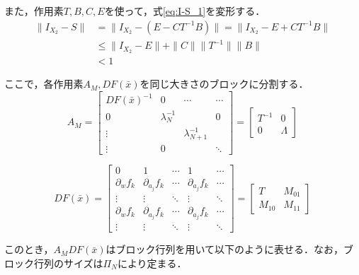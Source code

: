また，作用素$T,B,C,E$を使って，式\eqref{eq:I-S_1}を変形する．
\begin{equation}
  \label{eq:calc_norm}
  \begin{split}
    \|I_{X_2} - S \| &= \| I_{X_2} - (E-CT^{-1}B)  \| = \| I_{X_2} - E + CT^{-1}B \| \\
    & \leq \| I_{X_2} - E \| + \| C \| \| T^{-1} \| \| B \| \\
    & < 1
  \end{split}
\end{equation}

ここで，各作用素$A_M,DF(\bar{x})$を同じ大きさのブロックに分割する．
\begin{equation}
  A_M = \left[
    \begin{array}{c|ccc}
      DF(\bar{x})^{-1} & 0 & \cdots & \cdots \\ \hline
      0 & \lambda_N^{-1} &  & 0 \\
      \vdots &  & \lambda_{N+1}^{-1} &  \\
      \vdots & 0 &   & \ddots
    \end{array}
    \right]
    = \left[ \begin{array}{c|c}
        T^{-1} & 0 \\ \hline
        0 & \Lambda
    \end{array}\right]
\end{equation}

\begin{equation}
  DF(\bar{x}) = \left[
    \begin{array}{ccc|ccc}
      0 & 1 & \cdots  & 1 & \cdots \\
      \partial_w f_{k} &  \partial_{a_j}f_k & \cdots & \partial_{a_j}f_k & \cdots \\
      \vdots & \vdots & \ddots & \vdots  & \ddots\\ \hline
      \partial_w f_k & \partial_{a_j}f_k & \cdots & \partial_{a_j}f_k & \cdots \\
      \vdots & \vdots & \ddots & \vdots & \ddots
    \end{array}
  \right]
  = \left[ \begin{array}{c|c}
    T & M_{01} \\ \hline
    M_{10} & M_{11}
\end{array} \right]
\end{equation}

このとき，$A_M DF(\bar{x})$はブロック行列を用いて以下のように表せる．なお，ブロック行列のサイズは$\Pi_N$により定まる．

